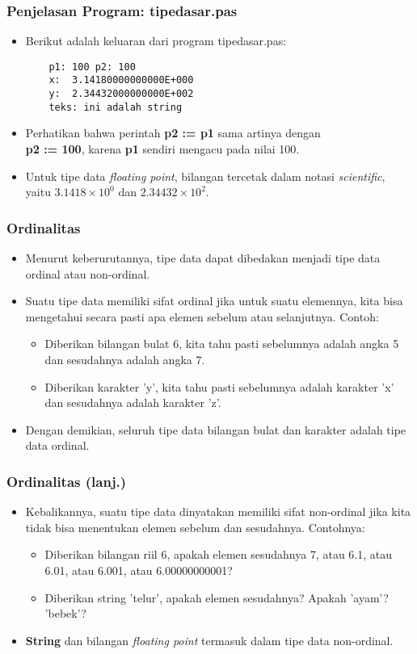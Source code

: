 \documentclass{beamer}
\begin{document}
\begin{frame}[fragile]
\frametitle{Penjelasan Program: tipedasar.pas}
\begin{itemize}
    \item Berikut adalah keluaran dari program tipedasar.pas:
    \begin{lstlisting}
    p1: 100 p2: 100
    x:  3.14180000000000E+000
    y:  2.34432000000000E+002
    teks: ini adalah string
    \end{lstlisting}
    \item Perhatikan bahwa perintah \textbf{p2 := p1} sama artinya dengan \\ \textbf{p2 := 100}, karena \textbf{p1} sendiri mengacu pada nilai 100.
    \item Untuk tipe data \textit{floating point}, bilangan tercetak dalam notasi \textit{scientific}, yaitu $3.1418 \times 10^{0}$ dan $2.34432 \times 10^{2}$.
\end{itemize}
\end{frame}

\begin{frame}
\frametitle{Ordinalitas}
\begin{itemize}
    \item Menurut keberurutannya, tipe data dapat dibedakan menjadi tipe data \alert{ordinal} atau \alert{non-ordinal}.
    \item Suatu tipe data memiliki sifat ordinal jika untuk suatu elemennya, kita bisa mengetahui secara pasti apa elemen sebelum atau selanjutnya. Contoh:
    \begin{itemize}
        \item Diberikan bilangan bulat 6, kita tahu pasti sebelumnya adalah angka 5 dan sesudahnya adalah angka 7.
        \item Diberikan karakter 'y', kita tahu pasti sebelumnya adalah karakter 'x' dan sesudahnya adalah karakter 'z'.
    \end{itemize}
    \item Dengan demikian, seluruh tipe data bilangan bulat dan karakter adalah tipe data ordinal.
\end{itemize}
\end{frame}

\begin{frame}
\frametitle{Ordinalitas (lanj.)}
\begin{itemize}
    \item Kebalikannya, suatu tipe data dinyatakan memiliki sifat non-ordinal jika kita tidak bisa menentukan elemen sebelum dan sesudahnya. Contohnya:
    \begin{itemize}
        \item Diberikan bilangan riil 6, apakah elemen sesudahnya 7, atau 6.1, atau 6.01, atau 6.001, atau 6.00000000001?
        \item Diberikan string 'telur', apakah elemen sesudahnya? Apakah 'ayam'? 'bebek'?
    \end{itemize}
    \item \textbf{String} dan bilangan \textit{floating point} termasuk dalam tipe data non-ordinal.
\end{itemize}
\end{frame}
\end{document}
